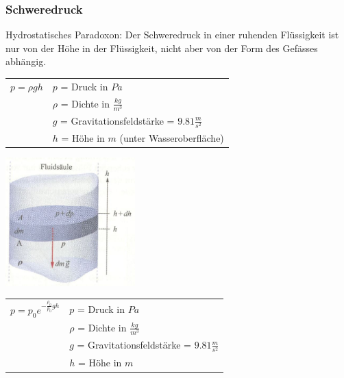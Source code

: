 	\subsubsection{Schweredruck}
		\begin{minipage}[t]{13cm}
				\begin{flushleft}
					Hydrostatisches Paradoxon: Der Schweredruck in einer ruhenden Flüssigkeit ist nur von der Höhe in der Flüssigkeit, nicht aber von der Form des Gefässes abhängig.
				\end{flushleft}
				\renewcommand{\arraystretch}{1.5}
				\begin{tabular}{ p{4cm} p{7cm}}
					$p = \rho gh$	&	$p$ = Druck in $Pa$\\
					& $\rho$ = Dichte in $\frac{kg}{m^3}$\\
					& $g$ = Gravitationsfeldstärke = $9.81\frac{m}{s^2}$\\
					& $h$ = Höhe in $m$ (unter Wasseroberfläche)\\
				\end{tabular}
				\renewcommand{\arraystretch}{1}
		\end{minipage}
		\begin{minipage}[t]{10cm}
			\vspace{-\ht\strutbox}\includegraphics[width=5cm]{./bilder/Schweredruck.jpg}
		\end{minipage}
		\newline
		\newline
		\newline
		\begin{minipage}[t]{13cm}
			\renewcommand{\arraystretch}{1.5}
			\begin{tabular}{ p{4cm} p{7cm}}
				$p = p_0 e^{-\frac{\rho_0}{p_0}gh}$	&	$p$ = Druck in $Pa$\\
				& $\rho$ = Dichte in $\frac{kg}{m^3}$\\
				& $g$ = Gravitationsfeldstärke = $9.81\frac{m}{s^2}$\\
				& $h$ = Höhe in $m$\\
			\end{tabular}
			\renewcommand{\arraystretch}{1}
		\end{minipage}
	
